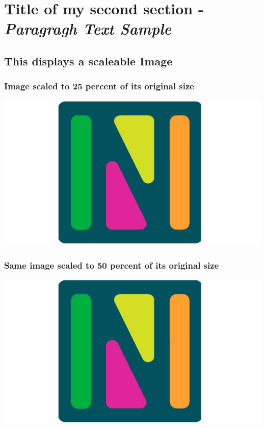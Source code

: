 \documentclass[a4paper,10pt]{article}
\begin{document}
 
\section{Title of my second section - \textit{Paragragh Text Sample}}
        \lipsum

\subsection{This displays a scaleable Image}

    \subsubsection{Image scaled to 25 percent of its original size}            
            
            \begin{center}
                \includegraphics[scale = 0.25]{logo.png}\\[1.0 cm]
            \end{center}
                \subsubsection{Same image scaled to 50 percent of its original size} 
            
           \begin{center}
                \includegraphics[scale = 0.50]{logo.png}\\[1.0 cm]
            \end{center}
    
\end{document}
